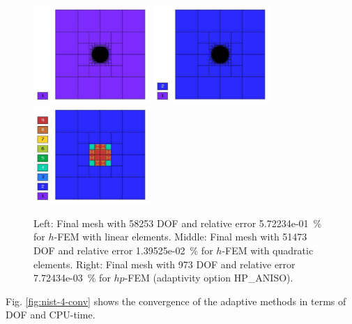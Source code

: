 \documentclass[12pt]{elsarticle}
\begin{document}
\begin{figure}[H]
\centering
\includegraphics[height=3.7cm]{mafig24.pdf}
\includegraphics[height=3.7cm]{mafig25.pdf}
\includegraphics[height=3.7cm]{mafig26.pdf}
\caption{
Left: Final mesh with 58253 DOF and relative error 5.72234e-01~\% for $h$-FEM with linear elements.
Middle: Final mesh with 51473 DOF and relative error 1.39525e-02~\% for $h$-FEM with quadratic elements.
Right: Final mesh with 973 DOF and relative error 7.72434e-03~\% for $hp$-FEM (adaptivity option HP\_ANISO).}
\label{fig:nist-4-hp-aniso}
\end{figure}

Fig. \ref{fig:nist-4-conv} shows the convergence of the adaptive methods in terms of DOF and CPU-time.
\end{document}
